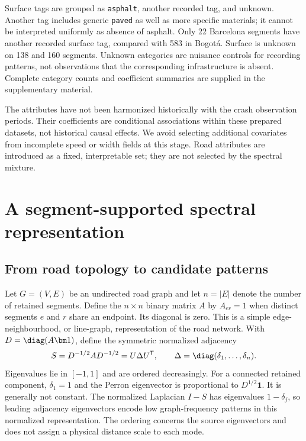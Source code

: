 \documentclass[11pt]{article}
\begin{document}
Surface tags are grouped as \texttt{asphalt}, another recorded tag, and unknown. Another tag includes generic \texttt{paved} as well as more specific materials; it cannot be interpreted uniformly as absence of asphalt. Only 22 Barcelona segments have another recorded surface tag, compared with 583 in Bogot\'a. Surface is unknown on 138 and 160 segments. Unknown categories are nuisance controls for recording patterns, not observations that the corresponding infrastructure is absent. Complete category counts and coefficient summaries are supplied in the supplementary material.

The attributes have not been harmonized historically with the crash observation periods. Their coefficients are conditional associations within these prepared datasets, not historical causal effects. We avoid selecting additional covariates from incomplete speed or width fields at this stage. Road attributes are introduced as a fixed, interpretable set; they are not selected by the spectral mixture.

\section{A segment-supported spectral representation}
\subsection{From road topology to candidate patterns}
Let $G=(V,E)$ be an undirected road graph and let $n=|E|$ denote the number of retained segments. Define the $n\times n$ binary matrix $A$ by $A_{er}=1$ when distinct segments $e$ and $r$ share an endpoint. Its diagonal is zero. This is a simple edge-neighbourhood, or line-graph, representation of the road network. With $D=\diag(A\bm 1)$, define the symmetric normalized adjacency
\begin{equation}
 S=D^{-1/2}AD^{-1/2}=U\Delta U^{\mathsf T},
 \qquad \Delta=\diag(\delta_1,\ldots,\delta_n).
 \label{eq:operator}
\end{equation}
Eigenvalues lie in $[-1,1]$ and are ordered decreasingly. For a connected retained component, $\delta_1=1$ and the Perron eigenvector is proportional to $D^{1/2}\bm 1$. It is generally not constant. The normalized Laplacian $I-S$ has eigenvalues $1-\delta_j$, so leading adjacency eigenvectors encode low graph-frequency patterns in this normalized representation. The ordering concerns the source eigenvectors and does not assign a physical distance scale to each mode.
\end{document}
